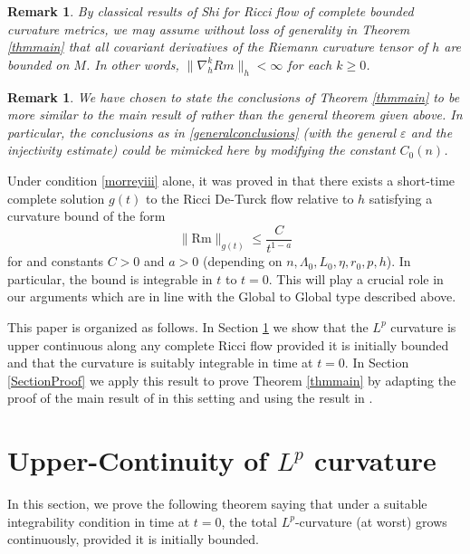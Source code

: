 \documentclass{amsart}
\newtheorem{remark}[thm]{Remark}
\theoremstyle{definition}
\newcommand{\Rm}{\mathrm{Rm}}
\let\epsilon\varepsilon
\begin{document}
\begin{remark}
By classical results of Shi \cite{Shi} for Ricci flow of complete bounded curvature metrics, we may assume  without loss of generality in Theorem \ref{thmmain} that all covariant derivatives of the Riemann curvature tensor of $h$ are bounded on $M$.  In other words, $\|\nabla^k_h Rm\|_h<\infty$ for each $k\geq 0$.  
\end{remark}


\begin{remark}
    We have chosen to state the conclusions of Theorem \ref{thmmain} to be more similar to the main result of \cite{ChauMartens} rather than the general theorem given above. In particular, the conclusions as in \eqref{generalconclusions} (with the general $\epsilon$ and the injectivity estimate) could be mimicked here by modifying the constant $C_0(n)$.\end{remark}

 Under condition \ref{morreyiii} alone, it was proved in \cite{LeeLiu} that there exists a short-time complete solution $g(t)$ to the Ricci De-Turck flow relative to $h$ satisfying a curvature bound of the form 
    \[
     \|\Rm\|_{g(t)}\leq \frac{C}{t^{1-a}}
    \]
for and constants $C>0$ and $a>0$ (depending on $n,\Lambda_0,L_0,\eta, r_0,p,h$).  In particular, the bound is integrable in $t$ to $t=0$.  This will play a crucial role in our arguments which are in line with the Global to Global type described above. 


This paper is organized as follows.  In Section \ref{SectionLp} we show that the $L^p$ curvature is upper continuous along any complete Ricci flow provided it is initially bounded and that the curvature is suitably integrable in time at $t=0$.  In Section \ref{SectionProof} we apply this result to prove Theorem \ref{thmmain} by adapting the proof of the main result of \cite{ChauMartens} in this setting and using the result in \cite{LeeLiu} . \\







\section{Upper-Continuity of $L^p$ curvature}\label{SectionLp}

In this section, we prove the following theorem saying that under a suitable integrability condition in time at $t=0$, the total $L^p$-curvature (at worst) grows continuously, provided it is initially bounded. 
\end{document}
